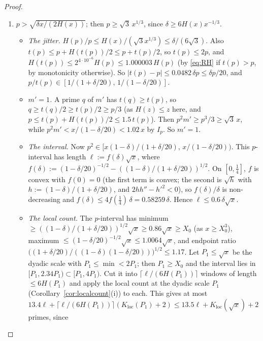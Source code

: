 \begin{proof}
\begin{enumerate}[label=(\roman*)]
\begin{itemize}
    least $1-10^{-8}$ apart (\S\ref{sec:noise-perscale}). So $J_p$ holds at most
    $(1+10^{-7})|J_p|+1.03H(x)+H(X_0)/2+3\le1.8|J_p|$ primes.
  \end{itemize}
  In both cases there are at most $2.03|J_p|\le2.1\,\delta x/p^2\le4\delta x/p^2$ elements $m'$. These pairs contribute at most
  $4\delta x\sum_{p\le\sqrt x}1/p$ to $\sum p$.
\item $p>\sqrt{\delta x/(2H(x))}$; then $p\ge\sqrt3\,x^{1/3}$, since $\delta\ge6H(x)x^{-1/3}$.
  \begin{itemize}
  \item \emph{The jitter.} $H(p)/p\le H(x)/(\sqrt3x^{1/3})\le\delta/(6\sqrt3)$. Also $t(p)\le p+H(t(p))/2\le p+t(p)/2$, so
    $t(p)\le2p$, and $H(t(p))\le2^{4\cdot10^{-6}}H(p)\le1.000003\,H(p)$ (by \eqref{eq:RH} if $t(p)>p$, by monotonicity otherwise). So
    $|t(p)-p|\le0.0482\,\delta p\le\delta p/20$, and $p/t(p)\in[1/(1+\delta/20),\,1/(1-\delta/20)]$.
  \item \emph{$m'=1$.} A prime $q$ of $m'$ has $t(q)\ge t(p)$, so $q\ge t(q)/2\ge t(p)/2\ge p/3$ (as $H(z)\le z$ here, and
    $p\le t(p)+H(t(p))/2\le1.5\,t(p)$). Then $p^2m'\ge p^3/3\ge\sqrt3\,x$, while $p^2m'<x/(1-\delta/20)<1.02\,x$ by $I_p$. So
    $m'=1$.
  \item \emph{The interval.} Now $p^2\in[x(1-\delta)/(1+\delta/20),\,x/(1-\delta/20))$. This $p$-interval has length
    $\ell:=f(\delta)\sqrt x$, where $f(\delta):=(1-\delta/20)^{-1/2}-((1-\delta)/(1+\delta/20))^{1/2}$. On $[0,\frac14]$, $f$ is convex
    with $f(0)=0$ (the first term is convex; the second is $\sqrt h$ with $h:=(1-\delta)/(1+\delta/20)$, and $2hh''-h'^2<0$), so
    $f(\delta)/\delta$ is non-decreasing and $f(\delta)\le4f(\frac14)\,\delta=0.58259\,\delta$. Hence $\ell\le0.6\,\delta\sqrt x$.
  \item \emph{The local count.} The $p$-interval has minimum $\ge((1-\delta)/(1+\delta/20))^{1/2}\sqrt x\ge0.86\sqrt x\ge X_0$ (as
    $x\ge X_0^3$), maximum $\le(1-\delta/20)^{-1/2}\sqrt x\le1.0064\sqrt x$, and endpoint ratio
    $\big((1+\delta/20)/((1-\delta)(1-\delta/20))\big)^{1/2}\le1.17$. Let $P_1\le\sqrt x$ be the dyadic scale with $P_1\le\min<2P_1$;
    then $P_1\ge X_0$ and the interval lies in $[P_1,2.34P_1)\subset[P_1,4P_1)$. Cut it into $\lceil\ell/(6H(P_1))\rceil$ windows
    of length $\le6H(P_1)$ and apply the local count at the dyadic scale $P_1$ (Corollary~\ref{cor:localcount}(i)) to each. This
    gives at most $13.4\ell+\lceil\ell/(6H(P_1))\rceil(K_{\mathrm{loc}}(P_1)+2)\le13.5\ell+K_{\mathrm{loc}}(\sqrt x)+2$ primes, since

\end{itemize}
\end{enumerate}
\end{proof}
